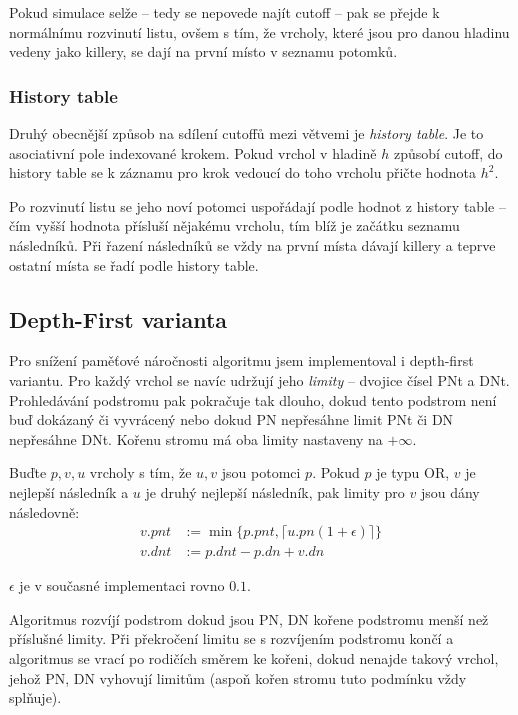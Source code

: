 \documentclass{article}
\begin{document}
Pokud simulace selže -- tedy se nepovede najít cutoff -- pak se přejde k
normálnímu rozvinutí listu, ovšem s tím, že vrcholy, které jsou pro danou
hladinu vedeny jako killery, se dají na první místo v seznamu potomků.

\subsubsection{History table}
\label{sec:heur-ht}
Druhý obecnější způsob na sdílení cutoffů mezi větvemi je \emph{history table}.
Je to asociativní pole indexované krokem. Pokud vrchol v hladině \(h\) způsobí
cutoff, do history table se k záznamu pro krok vedoucí do toho vrcholu přičte
hodnota \(h^2\).

Po rozvinutí listu se jeho noví potomci uspořádají podle hodnot z history table
-- čím vyšší hodnota přísluší nějakému vrcholu, tím blíž je začátku seznamu
následníků. Při řazení následníků se vždy na první místa dávají killery a 
teprve ostatní místa se řadí podle history table.

\subsection{Depth-First varianta}
\label{sec:dfpns}
Pro snížení paměťové náročnosti algoritmu jsem implementoval i depth-first
variantu. Pro každý vrchol se navíc udržují jeho \emph{limity} -- dvojice 
čísel PNt a DNt. Prohledávání podstromu pak pokračuje tak dlouho, dokud tento
podstrom není buď dokázaný či vyvrácený nebo dokud PN nepřesáhne limit PNt či
DN nepřesáhne DNt. Kořenu stromu má oba limity nastaveny na \(+\infty\).

Buďte \(p, v, u\) vrcholy s tím, že \(u, v\) jsou potomci \(p\). Pokud \(p\) je 
typu OR, \(v\) je nejlepší následník a \(u\) je druhý nejlepší následník, pak
limity pro \(v\) jsou dány následovně:
\begin{align*}
  v.pnt &:= \min \{ p.pnt, \lceil u.pn (1 + \epsilon) \rceil \} \\
  v.dnt &:= p.dnt - p.dn + v.dn
\end{align*}

\(\epsilon\) je v současné implementaci rovno \(0.1\).

Algoritmus rozvíjí podstrom dokud jsou PN, DN kořene podstromu menší než
příslušné limity. Při překročení limitu se s rozvíjením podstromu končí a 
algoritmus se vrací po rodičích směrem ke kořeni, dokud nenajde takový vrchol,
jehož PN, DN vyhovují limitům (aspoň kořen stromu tuto podmínku vždy splňuje).
\end{document}
